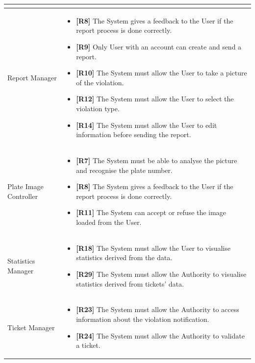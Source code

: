 \documentclass{article}
\begin{document}
\begin{longtable}{| p{5 cm} | p{8 cm} |}
\begin{itemize}
		\end{itemize}		\\	 \hline	
		\newline Report Manager  & 
		\begin{itemize}
			\item  {{\bf [R8]} The System gives a feedback to the User if the report process is done correctly.}
			\item  {{\bf [R9]} Only User with an account can create and send a report.}
			\item  {{\bf [R10]} The System must allow the User to take a picture of the violation.}
			\item  {{\bf [R12]} The System must allow the User to select the violation type.}
			\item  {{\bf[R14]} The System must allow the User to edit information before sending the report.}
		\end{itemize}		\\	 \hline	
		\newline Plate Image Controller & 
		\begin{itemize}
			\item  {{\bf[R7]} The System must be able to analyse the picture and recognise
the plate number.
}
			\item  {{\bf [R8]} The System gives a feedback to the User if the report process is done correctly.} 
			\item  {{\bf [R11]} The System can accept or refuse the image loaded from the User.}
		\end{itemize}		\\	 \hline	
		\newline Statistics Manager & 
		\begin{itemize}
			\item  {{\bf [R18]} The System must allow the User to visualise statistics derived from the data.}
			\item  {{\bf [R29]} The System must allow the Authority to visualise statistics derived from tickets’ data.}
		\end{itemize}		\\	 \hline		
			\newline Ticket Manager & 
		\begin{itemize}
			\item  {{\bf [R23]} The System must allow the Authority to access information
about the violation notification.}
			\item  {{\bf [R24]} The System must allow the Authority to validate a ticket.}

\end{itemize}
\end{longtable}
\end{document}
